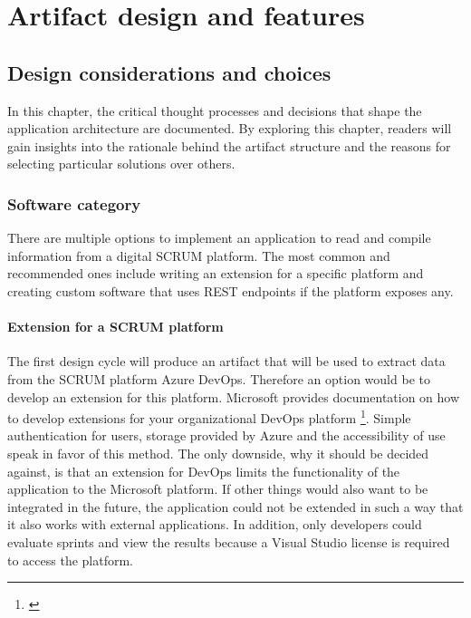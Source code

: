 \chapter{Artifact design and features} 

\label{Chapter5} 

\section{Design considerations and choices}

In this chapter, the critical thought processes and decisions that shape the application architecture are documented. By exploring this chapter, readers will gain insights into the rationale behind the artifact structure and the reasons for selecting particular solutions over others.

\subsection{Software category}

There are multiple options to implement an application to read and compile information from a digital SCRUM platform.
The most common and recommended ones include writing an extension for a specific platform and creating custom software that uses REST endpoints if the platform exposes any.

\subsubsection{Extension for a SCRUM platform}
The first design cycle will produce an artifact that will be used to extract data from the SCRUM platform Azure DevOps. Therefore an option would be to develop an extension for this platform.
Microsoft provides documentation on how to develop extensions for your organizational DevOps platform \footnote{\cite{AzureExtensions}}.
Simple authentication for users, storage provided by Azure and the accessibility of use speak in favor of this method.
The only downside, why it should be decided against, is that an extension for DevOps limits the functionality of the application to the Microsoft platform. If other things would also want to be integrated in the future, the application could not be extended in such a way that it also works with external applications. In addition, only developers could evaluate sprints and view the results because a Visual Studio license is required to access the platform.

